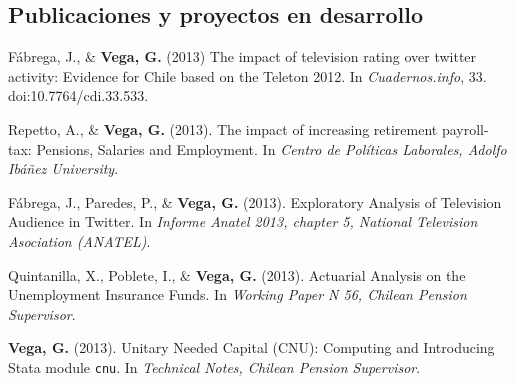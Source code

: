\documentclass[letterpaper, 11pt]{article}
\renewenvironment{itemize}{
  \begin{list}{}{
    \setlength{\leftmargin}{0.45cm}
  }
}{
  \end{list}
}
\begin{document}
\subsection*{Publicaciones y proyectos en desarrollo}
\begin{itemize}
\item F\'abrega, J., \& {\bf Vega, G.} (2013) The impact of television rating over twitter activity: Evidence for Chile based on the Teleton 2012. In {\it Cuadernos.info}, 33. doi:10.7764/cdi.33.533.
\item Repetto, A., \& {\bf Vega, G.} (2013). The impact of increasing retirement payroll-tax: Pensions, Salaries and Employment. In {\it Centro de Pol\'iticas Laborales, Adolfo Ib\'a\~nez University}.
\item F\'abrega, J., Paredes, P., \& {\bf Vega, G.} (2013). Exploratory Analysis of Television Audience in Twitter. In {\it Informe Anatel 2013, chapter 5, National Television Asociation (ANATEL)}.
\item Quintanilla, X., Poblete, I., \& {\bf Vega, G.} (2013). Actuarial Analysis on the Unemployment Insurance Funds. In {\it Working Paper N 56, Chilean Pension Supervisor}.
\item {\bf Vega, G.} (2013). Unitary Needed Capital (CNU): Computing and Introducing Stata module {\tt cnu}. In {\it Technical Notes, Chilean Pension Supervisor}.
\end{itemize}
\end{document}
